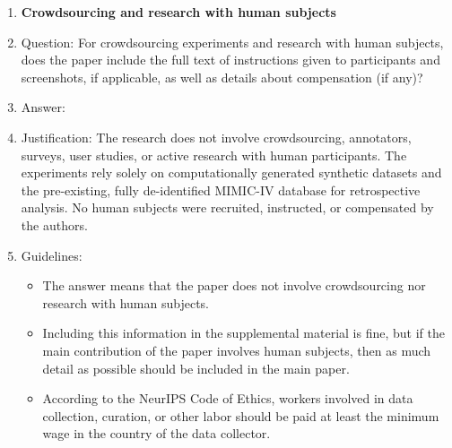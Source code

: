 \documentclass{article}
\theoremstyle{plain}
\theoremstyle{definition}
\theoremstyle{remark}
\begin{document}
\begin{enumerate}
\item {\bf Crowdsourcing and research with human subjects}
    \item[] Question: For crowdsourcing experiments and research with human subjects, does the paper include the full text of instructions given to participants and screenshots, if applicable, as well as details about compensation (if any)? 
    \item[] Answer: \answerNA{}
    \item[] Justification: The research does not involve crowdsourcing, annotators, surveys, user studies, or active research with human participants. The experiments rely solely on computationally generated synthetic datasets and the pre-existing, fully de-identified MIMIC-IV database for retrospective analysis. No human subjects were recruited, instructed, or compensated by the authors.
    \item[] Guidelines:
    \begin{itemize}
        \item The answer \answerNA{} means that the paper does not involve crowdsourcing nor research with human subjects.
        \item Including this information in the supplemental material is fine, but if the main contribution of the paper involves human subjects, then as much detail as possible should be included in the main paper. 
        \item According to the NeurIPS Code of Ethics, workers involved in data collection, curation, or other labor should be paid at least the minimum wage in the country of the data collector. 
    \end{itemize}


\end{enumerate}
\end{document}
